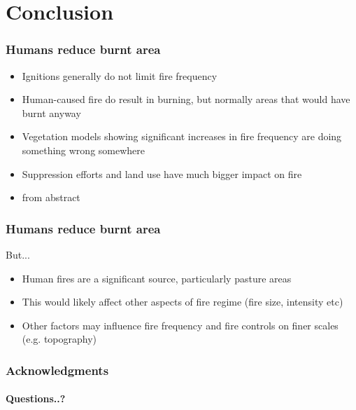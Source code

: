\section{Conclusion}


\begin{frame}
    \frametitle{Humans reduce burnt area}
	\begin{itemize}
		\item Ignitions generally do not limit fire frequency
		\item Human-caused fire do result in burning, but normally areas that would have burnt anyway
		\item Vegetation models showing significant increases in fire frequency are doing something wrong somewhere
		\item Suppression efforts and land use have much bigger impact on fire
		\item from abstract
	\end{itemize}
\end{frame}
\begin{frame}
    \frametitle{Humans reduce burnt area}
	\large{But...}
	\begin{itemize}
		\item Human fires are a significant source, particularly pasture areas
		\item This would likely affect other aspects of fire regime (fire size, intensity etc)
		\item Other factors may influence fire frequency and fire controls on finer scales (e.g. topography)
	\end{itemize}
\end{frame}

\begin{frame}
    \frametitle{Acknowledgments}
    \framesubtitle{Questions..?}
\end{frame}
